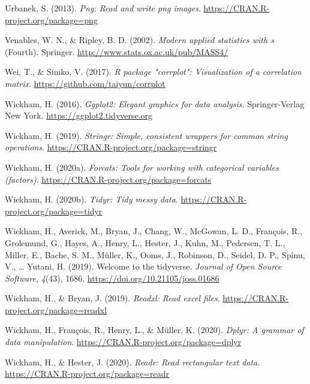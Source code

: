 \documentclass[
  english,
  man, noextraspace,floatsintext]{apa7}
\begin{document}
\begin{appendix}
\leavevmode\hypertarget{ref-R-png}{}%
Urbanek, S. (2013). \emph{Png: Read and write png images}.
\url{https://CRAN.R-project.org/package=png}

\leavevmode\hypertarget{ref-R-MASS}{}%
Venables, W. N., \& Ripley, B. D. (2002). \emph{Modern applied
statistics with s} (Fourth). Springer.
\url{http://www.stats.ox.ac.uk/pub/MASS4/}

\leavevmode\hypertarget{ref-R-corrplot2017}{}%
Wei, T., \& Simko, V. (2017). \emph{R package "corrplot": Visualization
of a correlation matrix}. \url{https://github.com/taiyun/corrplot}

\leavevmode\hypertarget{ref-R-ggplot2}{}%
Wickham, H. (2016). \emph{Ggplot2: Elegant graphics for data analysis}.
Springer-Verlag New York. \url{https://ggplot2.tidyverse.org}

\leavevmode\hypertarget{ref-R-stringr}{}%
Wickham, H. (2019). \emph{Stringr: Simple, consistent wrappers for
common string operations}.
\url{https://CRAN.R-project.org/package=stringr}

\leavevmode\hypertarget{ref-R-forcats}{}%
Wickham, H. (2020a). \emph{Forcats: Tools for working with categorical
variables (factors)}. \url{https://CRAN.R-project.org/package=forcats}

\leavevmode\hypertarget{ref-R-tidyr}{}%
Wickham, H. (2020b). \emph{Tidyr: Tidy messy data}.
\url{https://CRAN.R-project.org/package=tidyr}

\leavevmode\hypertarget{ref-R-tidyverse}{}%
Wickham, H., Averick, M., Bryan, J., Chang, W., McGowan, L. D.,
François, R., Grolemund, G., Hayes, A., Henry, L., Hester, J., Kuhn, M.,
Pedersen, T. L., Miller, E., Bache, S. M., Müller, K., Ooms, J.,
Robinson, D., Seidel, D. P., Spinu, V., \ldots{} Yutani, H. (2019).
Welcome to the tidyverse. \emph{Journal of Open Source Software},
\emph{4}(43), 1686. \url{https://doi.org/10.21105/joss.01686}

\leavevmode\hypertarget{ref-R-readxl}{}%
Wickham, H., \& Bryan, J. (2019). \emph{Readxl: Read excel files}.
\url{https://CRAN.R-project.org/package=readxl}

\leavevmode\hypertarget{ref-R-dplyr}{}%
Wickham, H., François, R., Henry, L., \& Müller, K. (2020). \emph{Dplyr:
A grammar of data manipulation}.
\url{https://CRAN.R-project.org/package=dplyr}

\leavevmode\hypertarget{ref-R-readr}{}%
Wickham, H., \& Hester, J. (2020). \emph{Readr: Read rectangular text
data}. \url{https://CRAN.R-project.org/package=readr}


\end{appendix}
\end{document}
